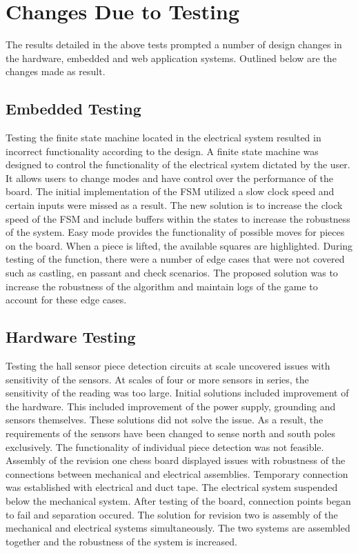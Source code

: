 \documentclass[12pt, titlepage]{article}
\begin{document}
\section{Changes Due to Testing}
The results detailed in the above tests prompted a number of design changes in 
the hardware, embedded and web application systems. Outlined below are the 
changes made as result. 

\subsection{Embedded Testing} 
Testing the finite state machine located in the electrical system resulted in 
incorrect functionality according to the design. A finite state machine was 
designed to control the functionality of the electrical system dictated by the
user. It allows users to change modes and have control over the performance 
of the board. The initial implementation of the FSM utilized a slow clock speed
and certain inputs were missed as a result. The new solution is to increase the
clock speed of the FSM and include buffers within the states to increase the
robustness of the system. 
\newline
\newline
Easy mode provides the functionality of possible moves for pieces on the board.
When a piece is lifted, the available squares are highlighted. During testing of 
the function, there were a number of edge cases that were not covered such as 
castling, en passant and check scenarios. The proposed solution was to increase
the robustness of the algorithm and maintain logs of the game to account for
these edge cases. 

\subsection{Hardware Testing}
Testing the hall sensor piece detection circuits at scale uncovered issues
with sensitivity of the sensors. At scales of four or more sensors in series, 
the sensitivity of the reading was too large. Initial solutions included 
improvement of the hardware. This included improvement of the power supply, 
grounding and sensors themselves. These solutions did not solve the issue. As 
a result, the requirements of the sensors have been changed to sense north and 
south poles exclusively. The functionality of individual piece detection was not
feasible. 
\newline
\newline
Assembly of the revision one chess board displayed issues with robustness of the
connections between mechanical and electrical assemblies. Temporary connection 
was established with electrical and duct tape. The electrical system suspended 
below the mechanical system. After testing of the board, connection points began 
to fail and separation occured. The solution for revision two is assembly of the
mechanical and electrical systems simultaneously. The two systems are assembled 
together and the robustness of the system is increased.
\end{document}
